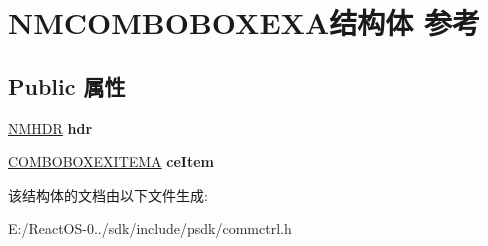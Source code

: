\hypertarget{struct_n_m_c_o_m_b_o_b_o_x_e_x_a}{}\section{N\+M\+C\+O\+M\+B\+O\+B\+O\+X\+E\+X\+A结构体 参考}
\label{struct_n_m_c_o_m_b_o_b_o_x_e_x_a}
\subsection*{Public 属性}
\begin{DoxyCompactItemize}
\item 
\mbox{\label{struct_n_m_c_o_m_b_o_b_o_x_e_x_a_a8790a63113b700267042f3ba1b391ff8}} 
\hyperlink{structtag_n_m_h_d_r}{N\+M\+H\+DR} {\bfseries hdr}
\item 
\mbox{\label{struct_n_m_c_o_m_b_o_b_o_x_e_x_a_ad97f064e476e015abf7d1808d2793fd0}} 
\hyperlink{structtag_c_o_m_b_o_b_o_x_e_x_i_t_e_m_a}{C\+O\+M\+B\+O\+B\+O\+X\+E\+X\+I\+T\+E\+MA} {\bfseries ce\+Item}
\end{DoxyCompactItemize}


该结构体的文档由以下文件生成\+:\begin{DoxyCompactItemize}
\item 
E\+:/\+React\+O\+S-\/0../sdk/include/psdk/commctrl.\+h\end{DoxyCompactItemize}
